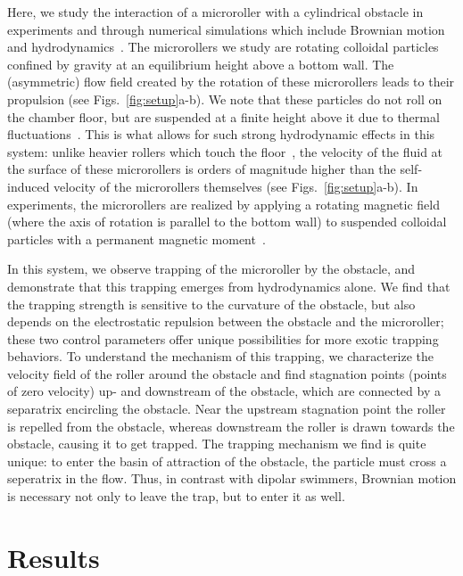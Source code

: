 \documentclass[12pt]{article}
\begin{document}
Here, we study the interaction of a microroller with a cylindrical obstacle in experiments and through numerical simulations which include Brownian motion and  hydrodynamics~\cite{sprinkle2017large,balboa2017hydrodynamics}.  The microrollers we study are rotating colloidal particles confined by gravity at an equilibrium height above a bottom wall.  The (asymmetric) flow field created by the rotation of these microrollers leads to their propulsion (see Figs.~\ref{fig:setup}a-b). We note that these particles do not roll on the chamber floor, but are suspended at a finite height above it due to thermal fluctuations~\cite{driscoll2017unstable}.  This is what allows for such strong hydrodynamic effects in this system: unlike heavier rollers which touch the floor~\cite{karani2019tuning,chamolly2020irreversible,demirors2021magnetic,bozuyuk2022high}, the velocity of the fluid at the surface of these  microrollers is orders of magnitude higher than the self-induced velocity of the microrollers themselves (see Figs.~\ref{fig:setup}a-b). In experiments, the microrollers are realized by applying a rotating magnetic field (where the axis of rotation is parallel to the bottom wall) to suspended colloidal particles with a permanent magnetic moment~\cite{driscoll2017unstable,sprinkle2017large,sprinkle2020active,delmotte2017minimal,balboa2017brownian,balboa2017hydrodynamics,junot2021collective}. 

In this system, we observe trapping of the microroller by the obstacle, and demonstrate that this trapping emerges from hydrodynamics alone.  We find that the trapping strength is sensitive to the curvature of the obstacle, but also depends on the electrostatic repulsion between the obstacle and the microroller; these two control parameters offer unique possibilities for more exotic trapping behaviors.  To understand the mechanism of this trapping, we characterize the velocity field of the roller around the obstacle and find stagnation points (points of zero velocity) up- and downstream of the obstacle, which are connected by a separatrix encircling the obstacle. Near the upstream stagnation point the roller is repelled from the obstacle, whereas downstream the roller is drawn towards the obstacle, causing it to get trapped. The trapping mechanism we find is quite unique: to enter the basin of attraction of the obstacle, the particle must cross a seperatrix in the flow.  Thus, in contrast with dipolar swimmers, Brownian motion is necessary not only to leave the trap, but to enter it as well.  

\section*{Results}
\end{document}
